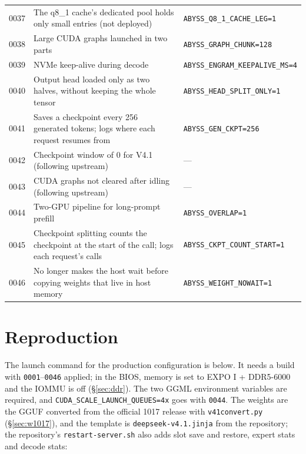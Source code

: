 \documentclass[11pt,a4paper]{article}
\newcommand{\code}[1]{\texttt{#1}}
\begin{document}
\begin{table}[h]
\begin{tabularx}{\textwidth}{@{}l X l@{}}
    0037 & The q8\_1 cache's dedicated pool holds only small entries (not deployed) & \code{ABYSS\_Q8\_1\_CACHE\_LEG=1} \\
    0038 & Large CUDA graphs launched in two parts & \code{ABYSS\_GRAPH\_CHUNK=128} \\
    0039 & NVMe keep-alive during decode & \code{ABYSS\_ENGRAM\_KEEPALIVE\_MS=4} \\
    0040 & Output head loaded only as two halves, without keeping the whole tensor & \code{ABYSS\_HEAD\_SPLIT\_ONLY=1} \\
    0041 & Saves a checkpoint every 256 generated tokens; logs where each request resumes from & \code{ABYSS\_GEN\_CKPT=256} \\
    0042 & Checkpoint window of 0 for V4.1 (following upstream) & --- \\
    0043 & CUDA graphs not cleared after idling (following upstream) & --- \\
    0044 & Two-GPU pipeline for long-prompt prefill & \code{ABYSS\_OVERLAP=1} \\
    0045 & Checkpoint splitting counts the checkpoint at the start of the call; logs each request's calls & \code{ABYSS\_CKPT\_COUNT\_START=1} \\
    0046 & No longer makes the host wait before copying weights that live in host memory & \code{ABYSS\_WEIGHT\_NOWAIT=1} \\
    \bottomrule
  \end{tabularx}
\end{table}

\section{Reproduction}

The launch command for the production configuration is below. It needs a build with \code{0001}--\code{0046} applied; in the BIOS, memory is set to EXPO I + DDR5-6000 and the IOMMU is off (\S\ref{sec:ddr}). The two GGML environment variables are required, and \code{CUDA\_SCALE\_LAUNCH\_QUEUES=4x} goes with \code{0044}. The weights are the GGUF converted from the official 1017 release with \code{v41convert.py} (\S\ref{sec:w1017}), and the template is \code{deepseek-v4.1.jinja} from the repository; the repository's \code{restart-server.sh} also adds slot save and restore, expert stats and decode stats:
\end{document}
